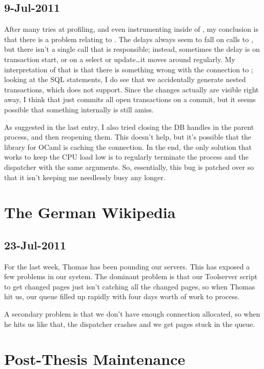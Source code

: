 \subsection{9-Jul-2011}

After many tries at profiling, and even instrumenting
inside of , my conclusion is that
there is a problem relating to \mysql.
The delays always seem to fall on calls to \mysql, but
there isn't a single call that is responsible; instead,
sometimes the delay is on transaction start, or on a select
or update\ldots it moves around regularly.
My interpretation of that is that there is something wrong
with the connection to \mysql; looking at the SQL statements,
I do see that we accidentally generate nested transactions,
which \mysql does not support.
Since the changes actually are visible right away, I think
that \mysql just commits all open transactions on a commit,
but it seems possible that something internally is still amiss.

As suggested in the last entry, I also tried closing the DB
handles in the parent process, and then reopening them.
This doesn't help, but it's possible that the \mysql library
for OCaml is caching the connection.
In the end, the only solution that works to keep the CPU load
low is to regularly terminate the process and 
the dispatcher with the same arguments.
So, essentially, this bug is patched over so that it isn't
keeping me needlessly busy any longer.

\section{The German Wikipedia}

\subsection{23-Jul-2011}

For the last week, Thomas has been pounding our servers.
This has exposed a few problems in our system.
The dominant problem is that our Toolserver script to get changed
pages just isn't catching all the changed pages,
so when Thomas hit us, our queue filled up rapidly with
four days worth of work to process.

A secondary problem is that we don't have enough \mysql
connection allocated, so when he hits us like that, the
dispatcher crashes and we get pages stuck in the queue.

\section{Post-Thesis Maintenance}

